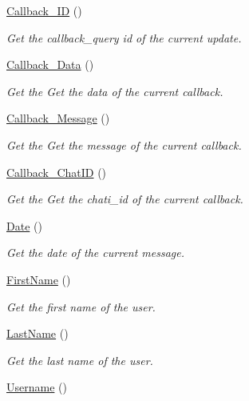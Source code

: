 \begin{DoxyCompactItemize}
\hyperlink{class_telegram_a61006cd19798be37ae51af5bc405ec71}{Callback\+\_\+\+I\+D} ()
\begin{DoxyCompactList}\small\item\em Get the callback\+\_\+query id of the current update. \end{DoxyCompactList}\item 
\hyperlink{class_telegram_a0df77a257a02ef572ca7d745f659e98d}{Callback\+\_\+\+Data} ()
\begin{DoxyCompactList}\small\item\em Get the Get the data of the current callback. \end{DoxyCompactList}\item 
\hyperlink{class_telegram_ad72a9632c75419625e9f194f400a31c9}{Callback\+\_\+\+Message} ()
\begin{DoxyCompactList}\small\item\em Get the Get the message of the current callback. \end{DoxyCompactList}\item 
\hyperlink{class_telegram_a848317ddda1c61f7173e55e0253b12e0}{Callback\+\_\+\+Chat\+I\+D} ()
\begin{DoxyCompactList}\small\item\em Get the Get the chati\+\_\+id of the current callback. \end{DoxyCompactList}\item 
\hyperlink{class_telegram_aff49fc2cda4491ff4457ca481bb8edf9}{Date} ()
\begin{DoxyCompactList}\small\item\em Get the date of the current message. \end{DoxyCompactList}\item 
\hypertarget{class_telegram_a0e3e32188dd1631ed1ed673ac844d999}{}\hyperlink{class_telegram_a0e3e32188dd1631ed1ed673ac844d999}{First\+Name} ()\label{class_telegram_a0e3e32188dd1631ed1ed673ac844d999}

\begin{DoxyCompactList}\small\item\em Get the first name of the user. \end{DoxyCompactList}\item 
\hypertarget{class_telegram_acf2c54b7fd06550cd64cf72194709a2c}{}\hyperlink{class_telegram_acf2c54b7fd06550cd64cf72194709a2c}{Last\+Name} ()\label{class_telegram_acf2c54b7fd06550cd64cf72194709a2c}

\begin{DoxyCompactList}\small\item\em Get the last name of the user. \end{DoxyCompactList}\item 
\hypertarget{class_telegram_a2521c81c6e75e23a361cc5a8a146f9c9}{}\hyperlink{class_telegram_a2521c81c6e75e23a361cc5a8a146f9c9}{Username} ()\label{class_telegram_a2521c81c6e75e23a361cc5a8a146f9c9}


\end{DoxyCompactItemize}
